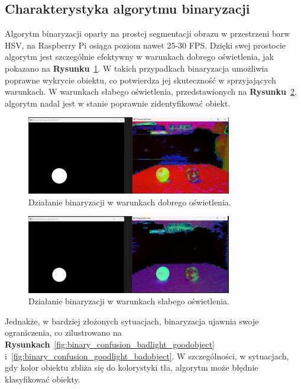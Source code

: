 \documentclass[a4paper,twoside,12pt]{book}
\begin{document}
\newpage
\subsection{Charakterystyka algorytmu binaryzacji}

Algorytm binaryzacji oparty na prostej segmentacji obrazu w przestrzeni barw HSV, na Raspberry Pi osiąga poziom nawet 25-30 FPS. Dzięki swej prostocie algorytm jest szczególnie efektywny w warunkach dobrego oświetlenia, jak pokazano na \textbf{Rysunku}~\ref{fig:binary_confusion_goodlight}. W takich przypadkach binaryzacja umożliwia poprawne wykrycie obiektu, co potwierdza jej skuteczność w sprzyjających warunkach.
W warunkach słabego oświetlenia, przedstawionych na \textbf{Rysunku}~\ref{fig:binary_confusion_badlight}, algorytm nadal jest w stanie poprawnie zidentyfikować obiekt. 

\begin{figure}[h]
    \centering
    \includegraphics[width=0.8\textwidth]{Images/Porownanie/Binaryzacja/Zrzut ekranu 2025-01-02 194021.png}
    \caption{Działanie binaryzacji w warunkach dobrego oświetlenia.}
    \label{fig:binary_confusion_goodlight}
\end{figure}

\begin{figure}[h]
    \centering
    \includegraphics[width=0.8\textwidth]{Images/Porownanie/Binaryzacja/Zrzut ekranu 2025-01-02 194004.png}
    \caption{Działanie binaryzacji w warunkach słabego oświetlenia.}
    \label{fig:binary_confusion_badlight}
\end{figure}

\newpage

Jednakże, w bardziej złożonych sytuacjach, binaryzacja ujawnia swoje ograniczenia, co zilustrowano na \textbf{Rysunkach}~\ref{fig:binary_confusion_badlight_goodobject} i~\ref{fig:binary_confusion_goodlight_badobject}. W szczególności, w sytuacjach, gdy kolor obiektu zbliża się do kolorystyki tła, algorytm może błędnie klasyfikować obiekty.
\end{document}

